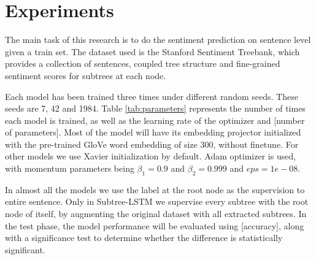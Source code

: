 \section{Experiments}
\label{sec: experiments}
The main task of this research is to do the sentiment prediction on sentence
level given a train set. The dataset used is the Stanford Sentiment
Treebank\cite{socher2013recursive}, which provides a collection of sentences,
coupled tree structure and fine-grained sentiment scores for subtrees at each
node.


Each model has been trained three times under different random seeds. These
seeds are 7, 42 and 1984. Table \ref{tab:parameters} represents the number of
times each model is trained, as well as the learning rate of the optimizer and
[number of parameters]. Most of the model will have its embedding projector
initialized with the pre-trained GloVe\cite{pennington2014glove} word embedding
of size 300, without finetune. For other models we use Xavier initialization by
default. Adam optimizer\cite{DBLP:journals/corr/KingmaB14} is used, with
momentum parameters being $\beta_{1}=0.9$ and $\beta_{2}=0.999$ and $eps=1e-08$.

In almost all the models we use the label at the root node as the supervision to
entire sentence. Only in Subtree-LSTM we supervise every subtree with the root
node of itself, by augmenting the original dataset with all extracted subtrees.
In the test phase, the model performance will be evaluated using [accuracy],
along with a significance test to determine whether the difference is
statistically significant.

